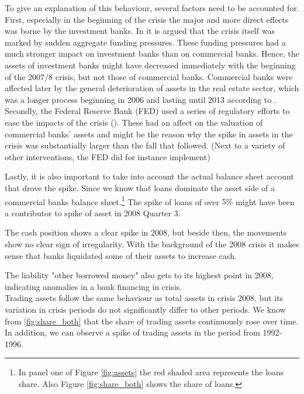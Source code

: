 \documentclass[12pt, a4paper]{article} %
\begin{document}
To give an explanation of this behaviour, several factors need to be accounted for. First, especially in the beginning of the crisis the major and more direct effects was borne by the investment banks. In \cite{antoniades2019commercial} it is argued that the crisis itself was marked by sudden aggregate funding pressures. These funding pressures had a much stronger impact on investment banks than on commercial banks. Hence, the assets of investment banks might have decreased immediately with the beginning of the $2007/8$ crisis, but not those of commercial banks. Commercial banks were affected later by the general deterioration of assets in the real estate sector, which was a longer process beginning in 2006 and lasting until 2013 according to \citet{antoniades2019commercial}.
Secondly, the Federal Reserve Bank (FED) used a series of regulatory efforts to ease the impacts of the crisis (\citet{FEDReport}). These had an affect on the valuation of commercial banks' assets and might be the reason why the spike in assets in the crisis was substantially larger than the fall that followed. (Next to a variety of other interventions, the FED did for instance implement) 

Lastly, it is also important to take into account the actual balance sheet account that drove the spike. Since we know that loans dominate the asset side of a commercial banks balance sheet.\footnote{In panel one of Figure \ref{fig:assets} the red shaded area represents the loans share. Also Figure \ref{fig:share_both} shows the share of loans.} The spike of loans of over $5\%$ might have been a contributor to spike of asset in 2008 Quarter 3. 


The cash position shows a clear spike in 2008, but beside then, the movements show no clear sign of irregularity. With the background of the 2008 crisis it makes sense that banks liquidated some of their assets to increase cash. 

The liability "other borrowed money" also gets to its highest point in 2008, indicating anomalies in a bank financing in crisis.\\

Trading assets follow the same behaviour as total assets in crisis 2008, but its variation in crisis periods do not significantly differ to other periods. We know from \ref{fig:share_both} that the share of trading assets continuously rose over time. In addition, we can observe a spike of trading assets in the period from 1992-1996.
\end{document}
